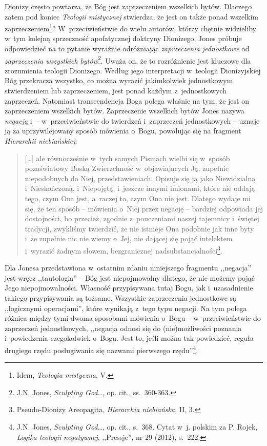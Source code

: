 Dionizy często powtarza, że Bóg jest zaprzeczeniem wszelkich bytów. Dlaczego zatem pod koniec \textit{Teologii mistycznej} stwierdza, że jest on także ponad wszelkim zaprzeczeniem\footnote{Idem, \textit{Teologia mistyczna}, V.}? W~przeciwieństwie do wielu autorów, którzy chętnie widzieliby w~tym kolejną sprzeczność apofatycznej doktryny Dionizego, Jones próbuje odpowiedzieć na to pytanie wyraźnie odróżniając \textit{zaprzeczenia jednostkowe} od \textit{zaprzeczenia wszystkich bytów}\footnote{J.N. Jones, \textit{Sculpting God}\ldots, op. cit., ss.~360-363.}. Uważa on, że to rozróżnienie jest kluczowe dla zrozumienia teologii Dionizego. Według jego interpretacji w~teologii Dionizyjskiej Bóg przekracza wszystko, co można wyrazić jakimkolwiek jednostkowym stwierdzeniem lub zaprzeczeniem, jest ponad każdym z~jednostkowych zaprzeczeń. Natomiast transcendencja Boga polega właśnie na tym, że jest on zaprzeczeniem wszelkich bytów. Zaprzeczenie wszelkich bytów Jones nazywa \textit{negacją} i~-- w~przeciwieństwie do twierdzeń i~zaprzeczeń jednostkowych -- uznaje ją za uprzywilejowany sposób mówienia o~Bogu, powołując się na fragment \textit{Hierarchii niebiańskiej}:

\begin{quote}
[\ldots] ale równocześnie w~tych samych Pismach wielbi się w~sposób pozaświatowy Boską Zwierzchność w~objawiających Ją, zupełnie niepodobnych do Niej, przedstawieniach. Opisuje się ją jako Niewidzialną i~Nieskończoną, i~Niepojętą, i~jeszcze innymi imionami, które nie oddają tego, czym Ona jest, a~raczej to, czym Ona nie jest. Dlatego wydaje mi się, że ten sposób -- mówienia o~Niej przez negację -- bardziej odpowiada jej dostojności, bo przecież, zgodnie z~pouczeniami naszej tajemnicy i~świętej tradycji, zwykliśmy twierdzić, że nie istnieje Ona podobnie jak inne byty i~że zupełnie nic nie wiemy o~Jej, nie dającej się pojąć intelektem i~wyrazić żadnym słowem, bezgranicznej nadsubstancjalności\footnote{Pseudo-Dionizy Areopagita, \textit{Hierarchia niebiańska}, II, 3.}.
\end{quote}

Dla Jonesa przedstawiona w~ostatnim zdaniu niniejszego fragmentu ,,negacja'' jest wręcz ,,tautologią'' -- Bóg jest niepojmowalny dlatego, że nie możemy pojąć Jego niepojmowalności. Własność przypisywana tutaj Bogu, jak i~uzasadnienie takiego przypisywania są tożsame. Wszystkie zaprzeczenia jednostkowe są ,,logicznymi operacjami'', które wynikają z~tego typu negacji. Na tym polega różnica między tymi dwoma sposobami mówienia o~Bogu -- w~przeciwieństwie do zaprzeczeń jednostkowych, ,,negacja odnosi się do (nie)możliwości poznania i~powiedzenia czegokolwiek o~Bogu. Jest to, jeśli można tak powiedzieć, reguła drugiego rzędu posługiwania się nazwami pierwszego rzędu''\footnote{J.N. Jones, \textit{Sculpting God}\ldots, op. cit., s.~368. Cytat w~j. polskim za P. Rojek, \textit{Logika teologii negatywnej}, ,,Pressje'', nr 29 (2012), s.~222.}.


